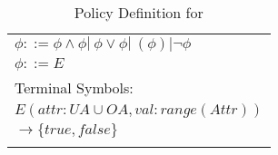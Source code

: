 \newcommand{\UAttrVal}{\text{UAttrVal}}
\newcommand{\OAttrVal}{\text{OAttrVal}}
\newcommand{\Action}{action}
\newcommand{\E}{E}
\begin{table}[]
\centering
\caption{Policy Definition for \sABAC}
\label{tab:sabac-def}
\begin{tabular}{@{}l@{}}
 \hline
	$\phi ::= \phi \land \phi | \ \phi \lor \phi | \ (\phi) | \neg \phi $\\
 
	$\phi ::= \E $ \\
	Terminal Symbols:\\
	$ \E (attr: UA \cup OA, val: range(Attr))$ \\ \hfill  $\to \{true, false\}$ \\
 \\\hline
\end{tabular}
\end{table}

